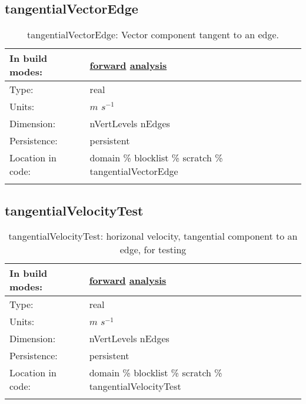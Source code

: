 \subsection[tangentialVectorEdge]{tangentialVectorEdge}
\label{subsec:var_sec_scratch_tangentialVectorEdge}
\begin{center}
\begin{longtable}{| p{2.0in} | p{4.0in} |}
        \hline 
        In build modes: & \hyperref[subsec:forward_var_tab_scratch]{forward} \hyperref[subsec:analysis_var_tab_scratch]{analysis} \\
        \hline 
        Type: & real \\
        \hline 
        Units: & $m$ $s^{-1}$ \\
        \hline 
        Dimension: & nVertLevels nEdges \\
        \hline 
        Persistence: & persistent \\
        \hline 
		 Location in code: & domain \% blocklist \% scratch \% tangentialVectorEdge \\
		 \hline 
    \caption{tangentialVectorEdge: Vector component tangent to an edge.}
\end{longtable}
\end{center}
\subsection[tangentialVelocityTest]{tangentialVelocityTest}
\label{subsec:var_sec_scratch_tangentialVelocityTest}
\begin{center}
\begin{longtable}{| p{2.0in} | p{4.0in} |}
        \hline 
        In build modes: & \hyperref[subsec:forward_var_tab_scratch]{forward} \hyperref[subsec:analysis_var_tab_scratch]{analysis} \\
        \hline 
        Type: & real \\
        \hline 
        Units: & $m$ $s^{-1}$ \\
        \hline 
        Dimension: & nVertLevels nEdges \\
        \hline 
        Persistence: & persistent \\
        \hline 
		 Location in code: & domain \% blocklist \% scratch \% tangentialVelocityTest \\
		 \hline 
    \caption{tangentialVelocityTest: horizonal velocity, tangential component to an edge, for testing}
\end{longtable}
\end{center}
